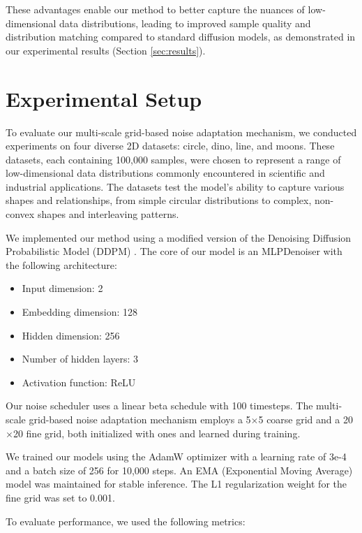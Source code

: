 \documentclass{article} %
\begin{document}
These advantages enable our method to better capture the nuances of low-dimensional data distributions, leading to improved sample quality and distribution matching compared to standard diffusion models, as demonstrated in our experimental results (Section \ref{sec:results}).

\section{Experimental Setup}
\label{sec:experimental}

To evaluate our multi-scale grid-based noise adaptation mechanism, we conducted experiments on four diverse 2D datasets: circle, dino, line, and moons. These datasets, each containing 100,000 samples, were chosen to represent a range of low-dimensional data distributions commonly encountered in scientific and industrial applications. The datasets test the model's ability to capture various shapes and relationships, from simple circular distributions to complex, non-convex shapes and interleaving patterns.

We implemented our method using a modified version of the Denoising Diffusion Probabilistic Model (DDPM) \cite{ddpm}. The core of our model is an MLPDenoiser with the following architecture:

\begin{itemize}
    \item Input dimension: 2
    \item Embedding dimension: 128
    \item Hidden dimension: 256
    \item Number of hidden layers: 3
    \item Activation function: ReLU
\end{itemize}

Our noise scheduler uses a linear beta schedule with 100 timesteps. The multi-scale grid-based noise adaptation mechanism employs a 5$\times$5 coarse grid and a 20$\times$20 fine grid, both initialized with ones and learned during training.

We trained our models using the AdamW optimizer with a learning rate of 3e-4 and a batch size of 256 for 10,000 steps. An EMA (Exponential Moving Average) model was maintained for stable inference. The L1 regularization weight for the fine grid was set to 0.001.

To evaluate performance, we used the following metrics:
\end{document}
